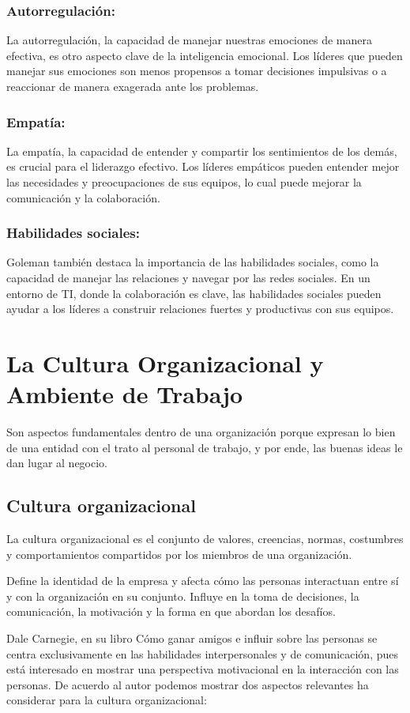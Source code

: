 \documentclass[journal]{IEEEtran}
\begin{document}
\subsubsection{Autorregulación:} La autorregulación, la capacidad de manejar nuestras emociones de manera efectiva, es otro aspecto clave de la inteligencia emocional. Los líderes que pueden manejar sus emociones son menos propensos a tomar decisiones impulsivas o a reaccionar de manera exagerada ante los problemas.
\subsubsection{Empatía:} La empatía, la capacidad de entender y compartir los sentimientos de los demás, es crucial para el liderazgo efectivo. Los líderes empáticos pueden entender mejor las necesidades y preocupaciones de sus equipos, lo cual puede mejorar la comunicación y la colaboración.
\subsubsection{Habilidades sociales:} Goleman también destaca la importancia de las habilidades sociales, como la capacidad de manejar las relaciones y navegar por las redes sociales. En un entorno de TI, donde la colaboración es clave, las habilidades sociales pueden ayudar a los líderes a construir relaciones fuertes y productivas con sus equipos.

\section{La Cultura Organizacional y Ambiente de Trabajo}
Son aspectos fundamentales dentro de una organización porque expresan lo bien de una entidad con el trato al personal de trabajo, y por ende, las buenas ideas le dan lugar al negocio.

\subsection{Cultura organizacional}
La cultura organizacional es el conjunto de valores, creencias, normas, costumbres y comportamientos compartidos por los miembros de una organización.

Define la identidad de la empresa y afecta cómo las personas interactuan entre sí y con la organización en su conjunto. Influye en la toma de decisiones, la comunicación, la motivación y la forma en que abordan los desafíos.

Dale Carnegie, en su libro Cómo ganar amigos e influir sobre las personas se centra exclusivamente en las habilidades interpersonales y de comunicación, pues está interesado en mostrar una perspectiva motivacional en la interacción con las personas. De acuerdo al autor podemos mostrar dos aspectos relevantes ha considerar para la cultura organizacional:
\end{document}

